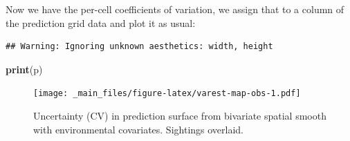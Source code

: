 \documentclass[]{book}
\newenvironment{Shaded}{\begin{snugshade}}{\end{snugshade}}
\newcommand{\KeywordTok}[1]{\textcolor[rgb]{0.13,0.29,0.53}{\textbf{#1}}}
\newcommand{\DataTypeTok}[1]{\textcolor[rgb]{0.13,0.29,0.53}{#1}}
\newcommand{\DecValTok}[1]{\textcolor[rgb]{0.00,0.00,0.81}{#1}}
\newcommand{\StringTok}[1]{\textcolor[rgb]{0.31,0.60,0.02}{#1}}
\newcommand{\OperatorTok}[1]{\textcolor[rgb]{0.81,0.36,0.00}{\textbf{#1}}}
\newcommand{\NormalTok}[1]{#1}
\theoremstyle{definition}
\theoremstyle{definition}
\theoremstyle{remark}
\begin{document}
Now we have the per-cell coefficients of variation, we assign that to a
column of the prediction grid data and plot it as usual:

\begin{Shaded}
\end{Shaded}

\begin{verbatim}
## Warning: Ignoring unknown aesthetics: width, height
\end{verbatim}

\begin{Shaded}
\begin{Highlighting}[]
\KeywordTok{print}\NormalTok{(p)}
\end{Highlighting}
\end{Shaded}

\begin{figure}
\centering
\texttt{[image: \_main\_files/figure-latex/varest-map-obs-1.pdf]}
\caption{\label{fig:varest-map-obs}Uncertainty (CV) in prediction surface
from bivariate spatial smooth with environmental covariates. Sightings
overlaid.}
\end{figure}
\end{document}
